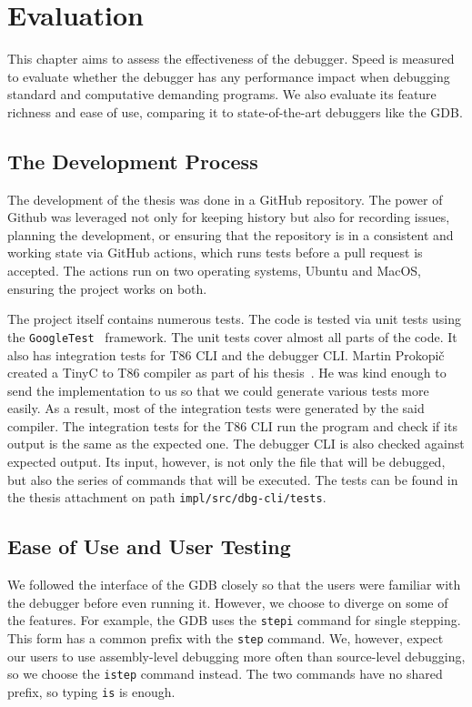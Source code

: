 \chapter{Evaluation}
This chapter aims to assess the effectiveness of the debugger. Speed is
measured to evaluate whether the debugger has any performance impact when
debugging standard and computative demanding programs. We also evaluate its
feature richness and ease of use, comparing it to state-of-the-art debuggers
like the GDB.

\section{The Development Process}
The development of the thesis was done in a GitHub repository. The power of
Github was leveraged not only for keeping history but also for recording
issues, planning the development, or ensuring that the repository is in a
consistent and working state via GitHub actions, which runs tests before a pull
request is accepted. The actions run on two operating systems, Ubuntu and
MacOS, ensuring the project works on both.

The project itself contains numerous tests. The code is tested via unit tests
using the \texttt{GoogleTest}~\cite{gtest} framework. The unit tests cover
almost all parts of the code. It also has integration tests for T86 CLI and the
debugger CLI. Martin Prokopič created a TinyC to T86 compiler as part of his
thesis~\cite{martintinyc}. He was kind enough to send the implementation to us
so that we could generate various tests more easily. As a result, most of the
integration tests were generated by the said compiler. The integration tests
for the T86 CLI run the program and check if its output is the same as the
expected one. The debugger CLI is also checked against expected output. Its
input, however, is not only the file that will be debugged, but also the series
of commands that will be executed. The tests can be found in the thesis
attachment on path \texttt{impl/src/dbg-cli/tests}.

\section{Ease of Use and User Testing}
We followed the interface of the GDB closely so that the users were familiar
with the debugger before even running it. However, we choose to diverge on some
of the features. For example, the GDB uses the \texttt{stepi} command for
single stepping. This form has a common prefix with the \texttt{step} command.
We, however, expect our users to use assembly-level debugging more often than
source-level debugging, so we choose the \texttt{istep} command instead. The
two commands have no shared prefix, so typing \texttt{is} is enough.


